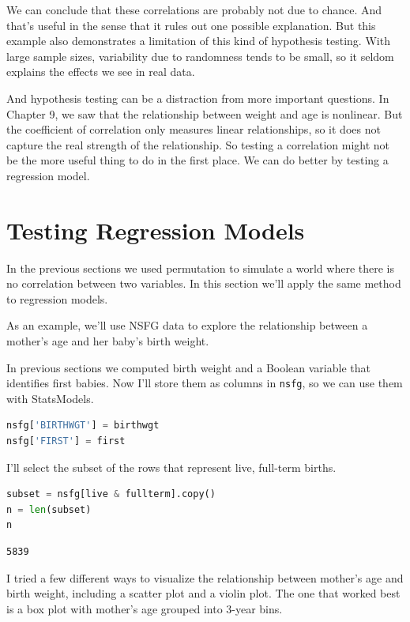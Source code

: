 We can conclude that these correlations are probably not due to chance.
And that's useful in the sense that it rules out one possible
explanation. But this example also demonstrates a limitation of this
kind of hypothesis testing. With large sample sizes, variability due to
randomness tends to be small, so it seldom explains the effects we see
in real data.

And hypothesis testing can be a distraction from more important
questions. In Chapter 9, we saw that the relationship between weight and
age is nonlinear. But the coefficient of correlation only measures
linear relationships, so it does not capture the real strength of the
relationship. So testing a correlation might not be the more useful
thing to do in the first place. We can do better by testing a regression
model.

\hypertarget{testing-regression-models}{%
\section{Testing Regression Models}\label{testing-regression-models}}

In the previous sections we used permutation to simulate a world where
there is no correlation between two variables. In this section we'll
apply the same method to regression models.

As an example, we'll use NSFG data to explore the relationship between a
mother's age and her baby's birth weight.

In previous sections we computed birth weight and a Boolean variable
that identifies first babies. Now I'll store them as columns in
\passthrough{\lstinline!nsfg!}, so we can use them with StatsModels.

\begin{lstlisting}[language=Python,style=source]
nsfg['BIRTHWGT'] = birthwgt
nsfg['FIRST'] = first
\end{lstlisting}

I'll select the subset of the rows that represent live, full-term
births.

\begin{lstlisting}[language=Python,style=source]
subset = nsfg[live & fullterm].copy()
n = len(subset)
n
\end{lstlisting}

\begin{lstlisting}[style=output]
5839
\end{lstlisting}

I tried a few different ways to visualize the relationship between
mother's age and birth weight, including a scatter plot and a violin
plot. The one that worked best is a box plot with mother's age grouped
into 3-year bins.


